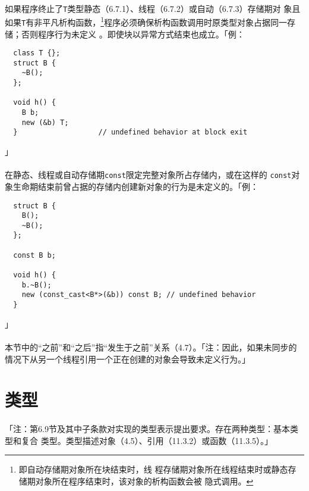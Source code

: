\paragraph{}
如果程序终止了\texttt{T}类型静态（6.7.1）、线程（6.7.2）或自动（6.7.3）存储期对
象且如果\texttt{T}有非平凡析构函数，\footnote{即自动存储期对象所在块结束时，线
程存储期对象所在线程结束时或静态存储期对象所在程序结束时，该对象的析构函数会被
隐式调用。}程序必须确保析构函数调用时原类型对象占据同一存储；否则程序行为未定义
。即使块以异常方式结束也成立。「例：
\begin{lstlisting}
  class T {};
  struct B {
    ~B();
  };

  void h() {
    B b;
    new (&b) T;
  }                   // undefined behavior at block exit
\end{lstlisting}」

\paragraph{}
在静态、线程或自动存储期\texttt{const}限定完整对象所占存储内，或在这样的
\texttt{const}对象生命期结束前曾占据的存储内创建新对象的行为是未定义的。「例：
\begin{lstlisting}
  struct B {
    B();
    ~B();
  };

  const B b;

  void h() {
    b.~B();
    new (const_cast<B*>(&b)) const B; // undefined behavior
  }
\end{lstlisting}」

\paragraph{}
本节中的``之前''和``之后''指``发生于之前''关系（4.7）。「注：因此，如果未同步的
情况下从另一个线程引用一个正在创建的对象会导致未定义行为。」

\section{类型}

\paragraph{}
「注：第6.9节及其中子条款对实现的类型表示提出要求。存在两种类型：基本类型和复合
类型。类型描述对象（4.5）、引用（11.3.2）或函数（11.3.5）。」

